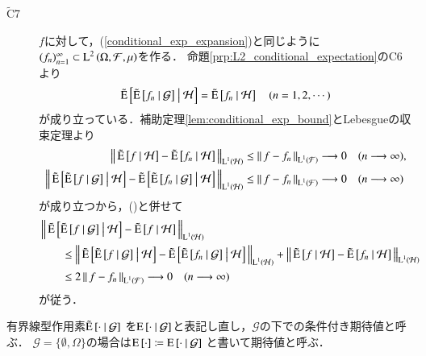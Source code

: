 \begin{prf}
\begin{description}
			\item[$\tilde{\mathrm{C}}$7]
				$f$に対して，(\ref{conditional_exp_expansion})と同じように$(f_n)_{n=1}^{\infty} \subset \Lp{2}{\Omega,\mathcal{F},\mu}$を作る．
				命題\ref{prp:L2_conditional_expectation}のC6より
				\begin{align}
					\tcexp{\tcexp{f_n}{\mathcal{G}}}{\mathcal{H}} = \tcexp{f_n}{\mathcal{H}}
					\quad (n=1,2,\cdots)
					\label{eq:conditional_exp_L1_2}
				\end{align}
				が成り立っている．補助定理\ref{lem:conditional_exp_bound}とLebesgueの収束定理より
				\begin{align}
					\Norm{ \tcexp{f}{\mathcal{H}} -  \tcexp{f_n}{\mathcal{H}}}{\Lp{1}{\mathcal{H}}}
					&\leq \Norm{f -  f_n}{\Lp{1}{\mathcal{F}}}
					\longrightarrow 0 \quad (n \longrightarrow \infty), \\
					\Norm{ \tcexp{\tcexp{f}{\mathcal{G}}}{\mathcal{H}} -  \tcexp{\tcexp{f_n}{\mathcal{G}}}{\mathcal{H}}}{\Lp{1}{\mathcal{H}}}
					&\leq \Norm{f -  f_n}{\Lp{1}{\mathcal{F}}}
					\longrightarrow 0 \quad (n \longrightarrow \infty)
				\end{align}
				が成り立つから，()と併せて
				\begin{align}
					&\Norm{ \tcexp{\tcexp{f}{\mathcal{G}}}{\mathcal{H}} - \tcexp{f}{\mathcal{H}} }{\Lp{1}{\mathcal{H}}} \\
					&\qquad\leq \Norm{ \tcexp{\tcexp{f}{\mathcal{G}}}{\mathcal{H}} -  \tcexp{\tcexp{f_n}{\mathcal{G}}}{\mathcal{H}}}{\Lp{1}{\mathcal{H}}}
						+ \Norm{ \tcexp{f}{\mathcal{H}} -  \tcexp{f_n}{\mathcal{H}}}{\Lp{1}{\mathcal{H}}} \\
					&\qquad \leq 2 \Norm{f -  f_n}{\Lp{1}{\mathcal{F}}} \longrightarrow 0 \quad (n \longrightarrow \infty)
				\end{align}
				が従う．
				\QED
		\end{description}
	\end{prf}
	
	\begin{screen}
		\begin{dfn}[条件付き期待値の再定義]
			有界線型作用素$\tcexp{\cdot}{\mathcal{G}}$
			を$\cexp{\cdot}{\mathcal{G}}$と表記し直し，$\mathcal{G}$の下での条件付き期待値と呼ぶ．
			$\mathcal{G} = \{\emptyset, \Omega\}$の場合は$\Exp{\cdot} \coloneqq \cexp{\cdot}{\mathcal{G}}$
			と書いて期待値と呼ぶ．
		\end{dfn}
	\end{screen}